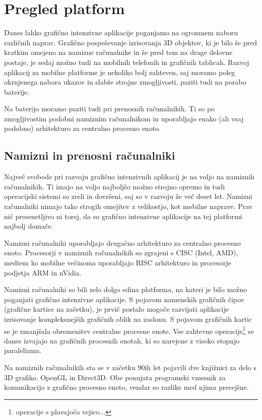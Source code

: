 \chapter{Pregled platform}

Danes lahko grafično intenzivne aplikacije poganjamo na ogromnem naboru različnih naprav. Grafično pospeševanje izrisovanja 3D objektov, ki je bilo še pred kratkim omejeno na namizne računalnike in še pred tem na drage delovne postaje, je sedaj možno tudi na mobilnih telefonih in grafičnih tablicah. Razvoj aplikacij za mobilne platforme je nekoliko bolj zahteven, saj moramo poleg okrnjenega nabora ukazov in slabše strojne zmogljivosti, paziti tudi na porabo baterije.

Na baterijo moramo paziti tudi pri prenosnih računalnikih. Ti so po zmogljivostim podobni namiznim računalnikom in uporabljajo enako (ali vsaj podobno) arhitekturo za centralno procesno enoto.

\section{Namizni in prenosni računalniki}

Največ svobode pri razvoju grafično intenzivnih aplikacij je na voljo na namiznih računalnikih. Ti imajo na voljo najboljšo možno strojno opremo in tudi operacijski sistemi so zreli in dovršeni, saj so v razvoju že več deset let. Namizni računalniki nimajo tako strogih omejitev z velikostjo, kot mobilne naprave. Prav nič presenetljivo ni torej, da so grafično intenzivne aplikacije na tej platformi najbolj domače. 

Namizni računalniki uporabljajo drugačno arhitekturo za centralno procesno enoto. Procesorji v namiznih računalnikih so zgrajeni s CISC (Intel, AMD), medtem ko mobilne večinoma uporabljajo RISC arhitekturo in procesorje podjetja ARM in nVidia. 

Namizni računalniki so bili zelo dolgo edina platforma, na kateri je bilo možno poganjati grafično intenzivne aplikacije. S pojavom namenskih grafičnih čipov (grafične kartice na začetku), je prvič postalo mogoče razvijati aplikacije izrisovanje kompleksnejših grafičnih oblik na zaslonu. S pojavom grafičnih kartic se je zmanjšala obremenitev centralne procesne enote. Vse zahtevne operacije\footnote{operacije s plavajočo vejico...} se danes izvajajo na grafičnih procesnih enotah, ki so narejene z visoko stopnjo paralelizma. 

Na namiznih računalnikih sta se v začetku 90ih let pojavili dve knjižnici za delo s 3D grafiko. OpenGL in Direct3D. Obe ponujata programski vmesnik za komunikacijo z grafično procesno enoto, vendar so razlike med njima precejšne.

